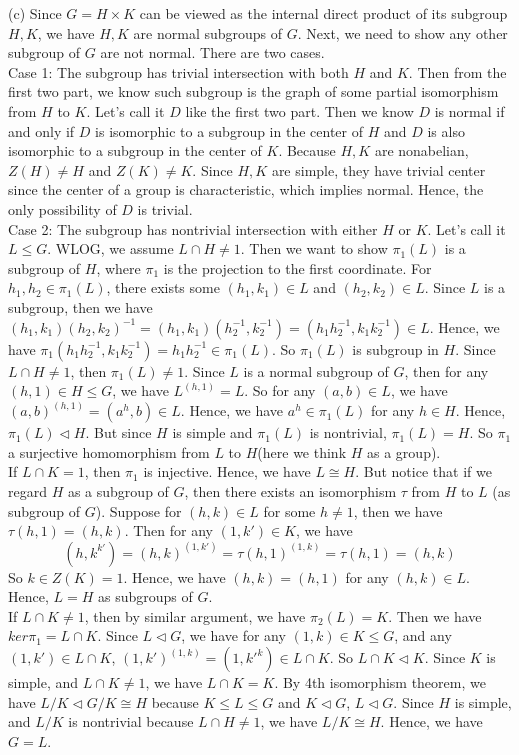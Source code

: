 \documentclass[12pt]{amsart}
\newcommand{\normal}{\triangleleft}
\begin{document}
(c) Since $G=H\times K$ can be viewed as the internal direct product of its subgroup $H,K$, we have $H,K$ are normal subgroups of $G$. Next, we need to show any other subgroup of $G$ are not normal. There are two cases.\\
Case 1: The subgroup has trivial intersection with both $H$ and $K$. Then from the first two part, we know such subgroup is the graph of some partial isomorphism from $H$ to $K$. Let's call it $D$ like the first two part. Then we know $D$ is normal if and only if $D$ is isomorphic to a subgroup in the center of $H$ and $D$ is also isomorphic to a subgroup in the center of $K$. Because $H,K$ are nonabelian, $Z(H)\neq H$ and $Z(K)\neq K$. Since $H,K$ are simple, they have trivial center since the center of a group is characteristic, which implies normal. Hence, the only possibility of $D$ is trivial.\\
Case 2: The subgroup has nontrivial intersection with either $H$ or $K$. Let's call it $L\leq G$. WLOG, we assume $L\cap H\neq 1$. Then we want to show $\pi_1(L)$ is a subgroup of $H$, where $\pi_1$ is the projection to the first coordinate. For $h_1,h_2\in \pi_1(L)$, there exists some $(h_1,k_1)\in L$ and $(h_2,k_2)\in L$. Since $L$ is a subgroup, then we have $(h_1,k_1)(h_2,k_2)^{-1}=(h_1,k_1)(h_2^{-1},k_2^{-1})=(h_1h_2^{-1},k_1k_2^{-1})\in L$. Hence, we have $\pi_1(h_1h_2^{-1},k_1k_2^{-1})=h_1h_2^{-1}\in \pi_1(L)$. So $\pi_1(L)$ is subgroup in $H$. Since $L\cap H\neq 1$, then $\pi_1(L)\neq 1$. Since $L$ is a normal subgroup of $G$, then for any $(h,1)\in H\leq G$, we have $L^{(h,1)}= L$. So for any $(a,b)\in L$, we have $(a,b)^{(h,1)}=(a^h,b)\in L$. Hence, we have $a^h\in \pi_1(L)$ for any $h\in H$. Hence, $\pi_1(L)\normal H$. But since $H$ is simple and $\pi_1(L)$ is nontrivial, $\pi_1(L)=H$. So $\pi_1$ a surjective homomorphism from $L$ to $H$(here we think $H$ as a group).\\
If $L\cap K=1$, then $\pi_1$ is injective. Hence, we have $L\cong H$. But notice that if we regard $H$ as a subgroup of $G$, then there exists an isomorphism $\tau$ from $H$ to $L$ (as subgroup of $G$). Suppose for $(h,k)\in L$ for some $h\neq 1$, then we have $\tau(h,1)=(h,k)$. Then for any $(1,k')\in K$, we have
\[(h,k^{k'})=(h,k)^{(1,k')}=\tau(h,1)^{(1,k)}=\tau(h,1)=(h,k)\]
So $k\in Z(K)=1$. Hence, we have $(h,k)=(h,1)$ for any $(h,k)\in L$. Hence, $L=H$ as subgroups of $G$.\\
If $L\cap K\neq 1$, then by similar argument, we have $\pi_2(L)=K$. Then we have $ker\pi_1=L\cap K$. Since $L\normal G$, we have for any $(1,k)\in K\leq G$, and any $(1,k')\in L\cap K$, $(1,k')^{(1,k)}=(1,k'^k)\in L\cap K$. So $L\cap K\normal K$. Since $K$ is simple, and $L\cap K\neq 1$, we have $L\cap K=K$. By 4th isomorphism theorem, we have $L/K\normal G/K\cong H$ because $K\leq L\leq G$ and $K\normal G$, $L\normal G$. Since $H$ is simple, and $L/K$ is nontrivial because $L\cap H\neq 1$, we have $L/K \cong H$. Hence, we have $G=L$.
\end{document}
